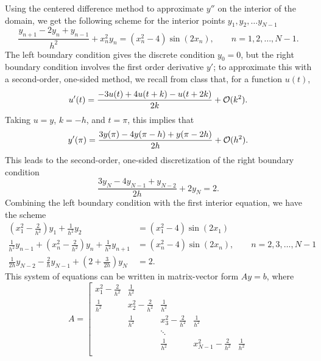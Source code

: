 \documentclass{homework}
\begin{document}
\begin{alphaparts}
		\questionpart Using the centered difference method to approximate $y''$ on the interior of the domain, we get the following scheme for the interior points $y_1, y_2, \dots y_{N-1}$
		\begin{equation*}
			\frac{y_{n+1} - 2y_n + y_{n-1}}{h^2} + x_n^2y_n = (x_n^2- 4)\sin(2x_n), \qquad n = 1, 2, \dots, N-1.
		\end{equation*}
		The left boundary condition gives the discrete condition $y_0 = 0$, but the right boundary condition involves the first order derivative $y'$; to approximate this with a second-order, one-sided method, we recall from class that, for a function $u(t)$,
		\begin{equation*}
			u'(t) = \frac{-3u(t) + 4u(t+k) - u(t+2k)}{2k} + \mathcal{O}(k^2).
		\end{equation*}
		Taking $u = y$, $k = -h$, and $t=\pi$, this implies that
		\begin{equation*}
			y'(\pi) = \frac{3y(\pi) - 4y(\pi - h) + y(\pi - 2h)}{2h} + \mathcal{O}(h^2).
		\end{equation*}
		This leads to the second-order, one-sided discretization of the right boundary condition
		\begin{equation*}
			\frac{3y_N - 4y_{N-1} + y_{N-2}}{2h} + 2y_N = 2.
		\end{equation*}
		Combining the left boundary condition with the first interior equation, we have the scheme
		\begin{align*}
			\left(x_1^2 -\frac{2}{h^2}\right)y_1 + \frac{1}{h^2}y_2 &= (x_1^2-4)\sin(2x_1) \\
			\frac{1}{h^2}y_{n-1} + \left(x_n^2 - \frac{2}{h^2}\right)y_n + \frac{1}{h^2}y_{n+1} &= (x_n^2- 4)\sin(2x_n), \qquad n = 2, 3, \dots, N-1 \\
			\frac{1}{2h}y_{N-2} - \frac{2}{h}y_{N-1} + \left(2 + \frac{3}{2h}\right)y_N &= 2.
		\end{align*}
		This system of equations can be written in matrix-vector form $Ay=b$, where
		\begin{equation*}
			A = \left[\begin{matrix}
				x_1^2 - \frac{2}{h^2} & \frac{1}{h^2} & & \\
				\frac{1}{h^2} & x_2^2 - \frac{2}{h^2} & \frac{1}{h^2} & \\
				& \frac{1}{h^2} & x_3^2 - \frac{2}{h^2} & \frac{1}{h^2} & \\
				& & \ddots & & \\
				& & \frac{1}{h^2} & x_{N-1}^2 - \frac{2}{h^2} & \frac{1}{h^2} \\[0.3em]

\end{matrix}
\end{equation*}
\end{alphaparts}
\end{document}
